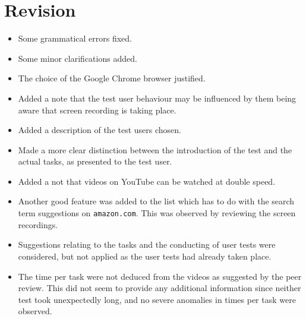 
\section{Revision}

\begin{itemize}

\item Some grammatical errors fixed.

\item Some minor clarifications added.

\item The choice of the Google Chrome browser justified.

\item Added a note that the test user behaviour may be influenced by them being
aware that screen recording is taking place.

\item Added a description of the test users chosen.

\item Made a more clear distinction between the introduction of the test and
the actual tasks, as presented to the test user.

\item Added a not that videos on YouTube can be watched at double speed.

\item Another good feature was added to the list which has to do with the
search term suggestions on \texttt{amazon.com}. This was observed by reviewing
the screen recordings.

\item Suggestions relating to the tasks and the conducting of user tests were
considered, but not applied as the user tests had already taken place.

\item The time per task were not deduced from the videos as suggested by the
peer review. This did not seem to provide any additional information since
neither test took unexpectedly long, and no severe anomalies in times per task
were observed.

\end{itemize}

